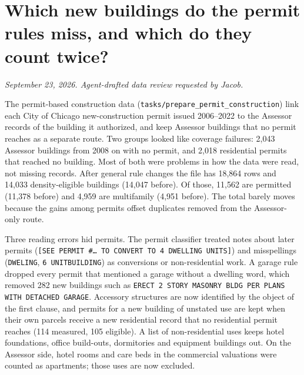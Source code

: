\clearpage
\section*{Which new buildings do the permit rules miss, and which do they count twice?}
\textit{September 23, 2026. Agent-drafted data review requested by Jacob.}

The permit-based construction data (\texttt{tasks/prepare\_permit\_construction}) link each City of Chicago
new-construction permit issued 2006--2022 to the Assessor records of the building it authorized, and keep Assessor
buildings that no permit reaches as a separate route. Two groups looked like coverage failures: 2,043 Assessor
buildings from 2008 on with no permit, and 2,018 residential permits that reached no building. Most of both were
problems in how the data were read, not missing records. After general rule changes the file has 18,864 rows
and 14,033 density-eligible buildings (14,047 before). Of those, 11,562 are permitted (11,378 before) and 4,959 are
multifamily (4,951 before). The total barely moves because the gains among permits offset duplicates removed from
the Assessor-only route.

Three reading errors hid permits. The permit classifier treated notes about later permits
(\texttt{[SEE PERMIT \#\ldots\ TO CONVERT TO 4 DWELLING UNITS]}) and misspellings (\texttt{DWELING},
\texttt{6 UNITBUILDING}) as conversions or non-residential work. A garage rule dropped every permit that mentioned a
garage without a dwelling word, which removed 282 new buildings such as \texttt{ERECT 2 STORY MASONRY BLDG PER PLANS
WITH DETACHED GARAGE}. Accessory structures are now identified by the object of the first clause, and permits
for a new building of unstated use are kept when their own parcels receive a new residential record that no
residential permit reaches (114 measured, 105 eligible). A list of non-residential uses keeps hotel foundations,
office build-outs, dormitories and equipment buildings out. On the Assessor side, hotel rooms and care beds in the
commercial valuations were counted as apartments; those uses are now excluded.

